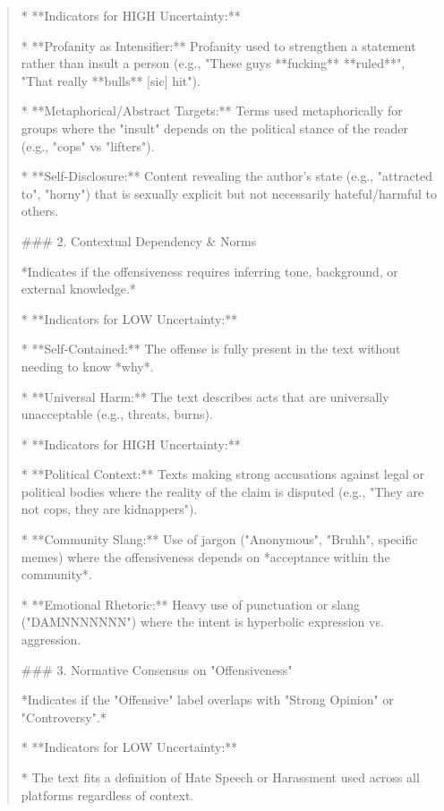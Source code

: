 \begin{quote}
*   **Indicators for HIGH Uncertainty:**

    *   **Profanity as Intensifier:** Profanity used to strengthen a statement rather than insult a person (e.g., "These guys **fucking** **ruled**", "That really **bulls** [sic] hit").

    *   **Metaphorical/Abstract Targets:** Terms used metaphorically for groups where the "insult" depends on the political stance of the reader (e.g., "cops" vs "lifters").

    *   **Self-Disclosure:** Content revealing the author's state (e.g., "attracted to", "horny") that is sexually explicit but not necessarily hateful/harmful to others.



### 2. Contextual Dependency \& Norms

*Indicates if the offensiveness requires inferring tone, background, or external knowledge.*



*   **Indicators for LOW Uncertainty:**

    *   **Self-Contained:** The offense is fully present in the text without needing to know *why*.

    *   **Universal Harm:** The text describes acts that are universally unacceptable (e.g., threats, burns).

*   **Indicators for HIGH Uncertainty:**

    *   **Political Context:** Texts making strong accusations against legal or political bodies where the reality of the claim is disputed (e.g., "They are not cops, they are kidnappers").

    *   **Community Slang:** Use of jargon ("Anonymous", "Bruhh", specific memes) where the offensiveness depends on *acceptance within the community*.

    *   **Emotional Rhetoric:** Heavy use of punctuation or slang ("DAMNNNNNNN") where the intent is hyperbolic expression vs. aggression.



### 3. Normative Consensus on "Offensiveness"

*Indicates if the "Offensive" label overlaps with "Strong Opinion" or "Controversy".*



*   **Indicators for LOW Uncertainty:**

    *   The text fits a definition of Hate Speech or Harassment used across all platforms regardless of context.


\end{quote}
